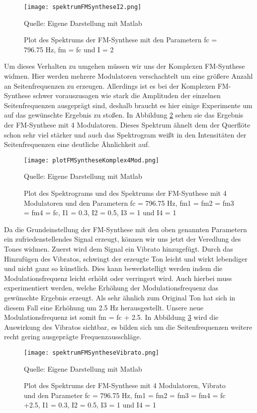 \begin{figure} [ht]
\centering
  \texttt{[image: spektrumFMSyntheseI2.png]}
\caption{Plot des Spektrums der FM-Synthese mit den Parametern fc = 796.75 Hz, fm = fc und I = 2}
\label{fig:spektrumFMSyntheseI2}
Quelle: Eigene Darstellung mit Matlab
\end{figure}

Um dieses Verhalten zu umgehen müssen wir uns der Komplexen FM-Synthese widmen. Hier werden mehrere Modulatoren verschachtelt um eine größere Anzahl an Seitenfrequenzen zu erzeugen. Allerdings ist es bei der Komplexen FM-Synthese schwer vorauszusagen wie stark die Amplituden der einzelnen Seitenfrequenzen ausgeprägt sind, deshalb braucht es hier einige Experimente um auf das gewünschte Ergebnis zu stoßen. In Abbildung \ref{fig:plotFMSyntheseKomplex4Mod} sehen sie das Ergebnis der FM-Synthese mit 4 Modulatoren. Dieses Spektrum ähnelt dem der Querflöte schon sehr viel stärker und auch das Spektrogram weißt in den Intensitäten der Seitenfrequenzen eine deutliche Ähnlichkeit auf.

\begin{figure} [ht]
\centering
  \texttt{[image: plotFMSyntheseKomplex4Mod.png]}
\caption{Plot des Spektrograms und des Spektrums der FM-Synthese mit 4 Modulatoren und den Parametern fc = 796.75 Hz, fm1 = fm2 = fm3 = fm4 = fc, I1 = 0.3, I2 = 0.5, I3 = 1 und I4 = 1}
\label{fig:plotFMSyntheseKomplex4Mod}
Quelle: Eigene Darstellung mit Matlab
\end{figure}

Da die Grundeinstellung der FM-Synthese mit den oben genannten Parametern ein zufriedenstellendes Signal erzeugt, können wir uns jetzt der Veredlung des Tones widmen. Zuerst wird dem Signal ein Vibrato hinzugefügt. Durch das Hinzufügen des Vibratos, schwingt der erzeugte Ton leicht und wirkt lebendiger und nicht ganz so künstlich. Dies kann bewerkstelligt werden indem die Modulationsfrequenz leicht erhöht oder verringert wird. Auch hierbei muss experimentiert werden, welche Erhöhung der Modulationsfrequenz das gewünschte Ergebnis erzeugt. Als sehr ähnlich zum Original Ton hat sich in diesem Fall eine Erhöhung um 2.5 Hz herausgestellt. Unsere neue Modulationsfrequenz ist somit fm = fc + 2.5. In Abbildung \ref{fig:spektrumFMSyntheseVibrato} wird die Auswirkung des Vibratos sichtbar, es bilden sich um die Seitenfrequenzen weitere recht gering ausgeprägte Frequenzausschläge.

\begin{figure} [ht]
\centering
  \texttt{[image: spektrumFMSyntheseVibrato.png]}
\caption{Plot des Spektrums der FM-Synthese mit 4 Modulatoren, Vibrato und den Parameter fc = 796.75 Hz, fm1 = fm2 = fm3 = fm4 = fc +2.5, I1 = 0.3, I2 = 0.5, I3 = 1 und I4 = 1}
\label{fig:spektrumFMSyntheseVibrato}
Quelle: Eigene Darstellung mit Matlab
\end{figure}

